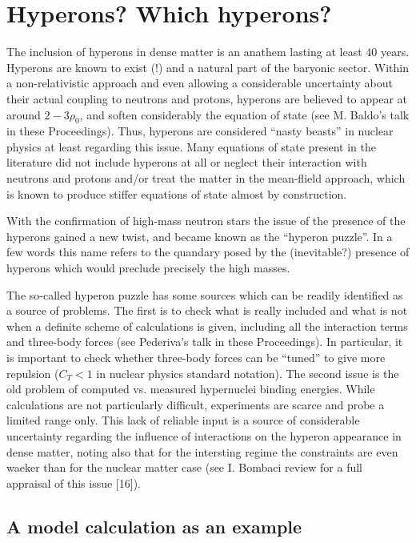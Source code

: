 \documentclass[a4paper]{jpconf}
\begin{document}
\section{Hyperons? Which hyperons?}

The inclusion of hyperons in dense matter is an anathem lasting at least 40 years. Hyperons are known to exist (!) 
and a natural part of the baryonic sector. Within a non-relativistic approach and even allowing a considerable 
uncertainty about their actual coupling to neutrons and protons, hyperons are believed to appear at around 
$2-3 \rho_{0}$, and soften considerably the equation of state (see M. Baldo's talk in these Proceedings). Thus, 
hyperons are considered ``nasty beasts'' in nuclear physics at least regarding this issue. Many equations 
of state present in the literature did not include hyperons at all or neglect their interaction with neutrons and 
protons and/or treat the matter in the mean-flield approach, which is known to produce stiffer equations of 
state almost by construction.

With the confirmation of high-mass neutron stars the issue of the presence of the hyperons gained a new twist, and 
became known as the ``hyperon puzzle''. In a few words this name refers to the quandary posed by the (inevitable?) 
presence of hyperons which would preclude precisely the high masses. 

The so-called hyperon puzzle has some sources which can be readily identified as a source of problems. 
The first is to check what is really included and what is not when a definite scheme of calculations is given, including 
all the interaction terms and three-body forces (see Pederiva's talk in these Proceedings). In particular, it is 
important to check whether three-body forces can be ``tuned'' to give more repulsion ($C_{T} < 1$ in nuclear 
physics standard notation). The second issue is the old problem of computed vs. measured hypernuclei binding 
energies. While calculations are not particularly difficult,  experiments are scarce and probe a limited range 
only. This lack of reliable input is a source of considerable uncertainty regarding the influence of interactions on 
the hyperon appearance in dense matter, noting also that for the intersting regime the constraints are even 
waeker than for the nuclear matter case (see I. Bombaci review for a full appraisal of this issue [16]).

\subsection{A model calculation as an example}
\end{document}
